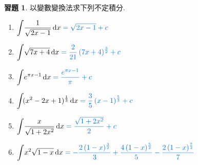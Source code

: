 \documentclass[12pt,a4paper]{extarticle}
\newcommand{\ds}{\displaystyle}
\theoremstyle{definition}
\newtheorem*{exe}{習題}
\begin{document}
\begin{exe} 以變數變換法求下列不定積分. 
  \setlength{\columnsep}{-2cm}
  \begin{multicols}{2}
    \begin{enumerate}\setlength{\itemsep}{0pt}
      \item $\ds\int\!\frac{1}{\sqrt{2 x - 1}}\,\mathrm{d}x {\color{C2}\;= \sqrt{2x - 1} + c}$
      \item $\ds\int\!\sqrt{7x + 4}\,\mathrm{d}x {\color{C2}\;= \frac{2}{21}\,(7x + 4)^{\frac{3}{2}} + c}$
      \item $\ds\int\!e^{\pi x - 1}\,\mathrm{d}x {\color{C2}\;= \frac{e^{\pi x - 1}}{\pi} + c}$
      \item $\ds\int\!(x^2 - 2x + 1)^{\frac{1}{3}}\,\mathrm{d}x {\color{C2}\;= \frac{3}{5}\,(x - 1)^{\frac{5}{3}} + c}$
      \item $\ds\int\!\frac{x}{\sqrt{1 + 2x^2}}\,\mathrm{d}x {\color{C2}\;= \frac{\sqrt{1 + 2x^2}}{2} + c}$
      \item $\ds\int\!x^2\sqrt{1 - x}\,\mathrm{d}x {\color{C2}\;= -\frac{2\,(1 - x)^{\frac{3}{2}}}{3} + \frac{4\,(1 - x)^{\frac{5}{2}}}{5} - \frac{2\,(1 - x)^{\frac{7}{2}}}{7}}$
    \end{enumerate} 
  \end{multicols}
\end{exe}
\end{document}
